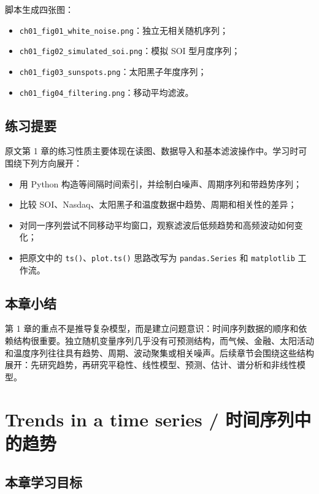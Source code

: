 \documentclass[11pt,a4paper,openany]{ctexbook}
\begin{document}
脚本生成四张图：
\begin{itemize}
  \item \texttt{ch01\_fig01\_white\_noise.png}：独立无相关随机序列；
  \item \texttt{ch01\_fig02\_simulated\_soi.png}：模拟 SOI 型月度序列；
  \item \texttt{ch01\_fig03\_sunspots.png}：太阳黑子年度序列；
  \item \texttt{ch01\_fig04\_filtering.png}：移动平均滤波。
\end{itemize}

\section{练习提要}

原文第 1 章的练习性质主要体现在读图、数据导入和基本滤波操作中。学习时可围绕下列方向展开：
\begin{itemize}
  \item 用 Python 构造等间隔时间索引，并绘制白噪声、周期序列和带趋势序列；
  \item 比较 SOI、Nasdaq、太阳黑子和温度数据中趋势、周期和相关性的差异；
  \item 对同一序列尝试不同移动平均窗口，观察滤波后低频趋势和高频波动如何变化；
  \item 把原文中的 \texttt{ts()}、\texttt{plot.ts()} 思路改写为 \texttt{pandas.Series} 和 \texttt{matplotlib} 工作流。
\end{itemize}

\section*{本章小结}

第 1 章的重点不是推导复杂模型，而是建立问题意识：时间序列数据的顺序和依赖结构很重要。独立随机变量序列几乎没有可预测结构，而气候、金融、太阳活动和温度序列往往具有趋势、周期、波动聚集或相关噪声。后续章节会围绕这些结构展开：先研究趋势，再研究平稳性、线性模型、预测、估计、谱分析和非线性模型。

\clearpage
\chapter{Trends in a time series / 时间序列中的趋势}
\section*{本章学习目标}
\end{document}
